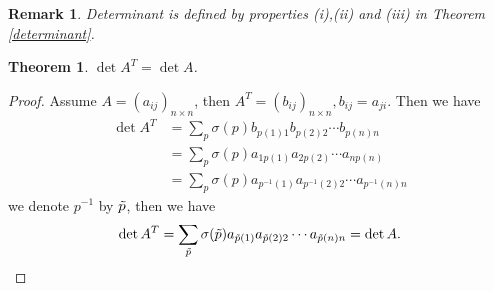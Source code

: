 \documentclass[11pt]{book}
\newtheorem{theorem}{Theorem}[section]
\newtheorem{remark}{Remark}[section]
\theoremstyle{definition}
\numberwithin{equation}{chapter}
\begin{document}
\begin{remark}
Determinant is defined by properties (i),(ii) and (iii) in Theorem \ref{determinant}.
\end{remark}

\medskip

\begin{theorem}
$\det A^T = \det A$.
\end{theorem}
\begin{proof}
Assume $A = (a_{ij})_{n\times n}$, then $A^T = (b_{ij})_{n\times n}, b_{ij} = a_{ji}$. Then we have 
\begin{align*}
    \det A^T & = \sum_p \sigma(p) b_{p(1)1} b_{p(2)2} \cdots b_{p(n)n} \\
    & = \sum_p \sigma(p) a_{1 p(1)} a_{2 p(2)} \cdots a_{n p(n)} \\
    & = \sum_p \sigma(p) a_{p^{-1}(1)} a_{p^{-1}(2) 2} \cdots a_{p^{-1}(n) n}
\end{align*}
we denote $p^{-1}$ by $\Tilde{p}$, then we have
\begin{align*}
    \det A^T = \sum_{\Tilde{p}} \sigma(\Tilde{p}) a_{\Tilde{p}(1)} a_{\Tilde{p}(2) 2} \cdots a_{\Tilde{p}(n) n} = \det A.
\end{align*}
\end{proof}

\medskip
\end{document}
